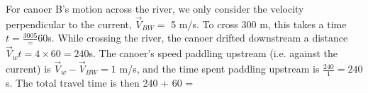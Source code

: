 \documentclass{article}[10pt]
\begin{document}
\begin{enumerate}
\begin{enumerate}[(a)]
{\color{red} For canoer B's motion across the river, we only consider the velocity perpendicular to the current, $\vec{V}_{BW} =$ 5 m/s. 
To cross 300 m, this takes a time $t = \frac{300{5}} = 60$s. While crossing the river, the canoer drifted downstream a distance $\vec{V}_w t = 
4 \times 60 = 240$s. The canoer's speed paddling upstream (i.e. against the current) is $\vec{V}_w - \vec{V}_{BW} = 1$ m/s, and the time
spent paddling upstream is $\frac{240}{1} = 240$s. The total travel time is then 240 + 60  = }


\end{enumerate} %

\end{enumerate} %
  
  
  
  
  
  
  
  
  
  
  
  
  
  
  
  
  
  
  
  
  
  
  
  
  
\end{document}
